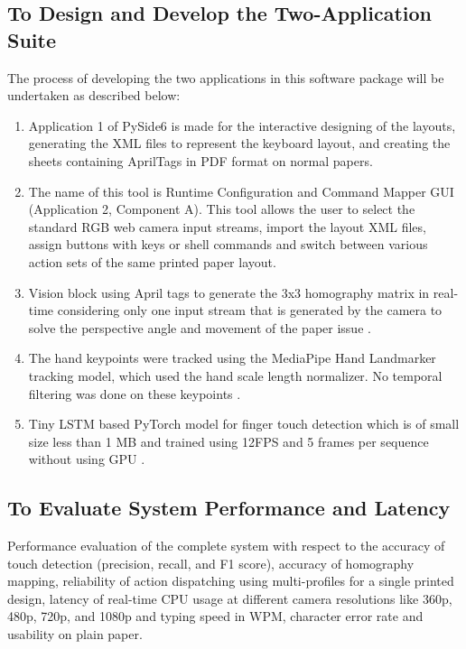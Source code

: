 \subsection{To Design and Develop the Two-Application Suite}
\label{subsec:obj_design}
The process of developing the two applications in this software package will be undertaken as described below:
\begin{enumerate}
    \item Application 1 of PySide6 is made for the interactive designing of the layouts, generating the XML files to represent the keyboard layout, and creating the sheets containing AprilTags in PDF format on normal papers.
    \item The name of this tool is Runtime Configuration and Command Mapper GUI (Application 2, Component A). This tool allows the user to select the standard RGB web camera input streams, import the layout XML files, assign buttons with keys or shell commands and switch between various action sets of the same printed paper layout.
    \item Vision block using April tags to generate the 3x3 homography matrix in real-time considering only one input stream that is generated by the camera to solve the perspective angle and movement of the paper issue \cite{Wang2016AprilTag2, Kallwies2020Determining}.
    \item The hand keypoints were tracked using the MediaPipe Hand Landmarker tracking model, which used the hand scale length normalizer. No temporal filtering was done on these keypoints \cite{Zhang2020MediaPipe, SanchezBrizuela2023Lightweight}.
    \item Tiny LSTM based PyTorch model for finger touch detection which is of small size less than 1 MB and trained using 12FPS and 5 frames per sequence without using GPU \cite{Hochreiter1997LSTM, GilMartin2023Hand, Simao2016Unsupervised}.
\end{enumerate}

\subsection{To Evaluate System Performance and Latency}
\label{subsec:obj_evaluate}
Performance evaluation of the complete system with respect to the accuracy of touch detection (precision, recall, and F1 score), accuracy of homography mapping, reliability of action dispatching using multi-profiles for a single printed design, latency of real-time CPU usage at different camera resolutions like 360p, 480p, 720p, and 1080p and typing speed in WPM, character error rate and usability on plain paper.

